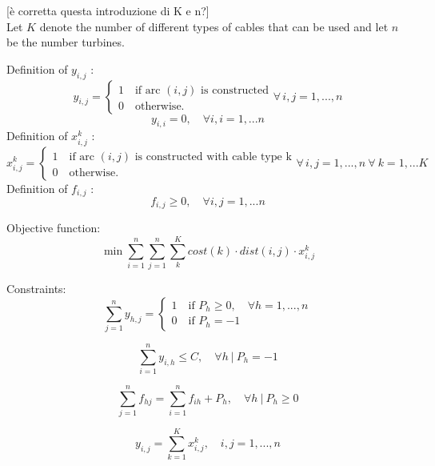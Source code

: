 [è corretta questa introduzione di K e n?]\\

Let $K$ denote the number of different types of cables that can be used and let $n$ be the number turbines. 

Definition of $y_{i,j}$ :
\[
	y_{i,j} =
   \begin{cases}
   1 \quad \mbox{if arc } (i,j) \mbox{ is constructed} \\
   0 \quad \mbox{otherwise.} 
   \end{cases}
   \forall \,i,j = 1, ..., n 
\]
\[
	y_{i,i} = 0, \quad \forall i,i= 1, ... n 
\]
Definition of $x^k_{i,j}$ :
\[
	x^k_{i,j} =
   \begin{cases}
   1 \quad \mbox{if arc } (i,j) \mbox{ is constructed with cable type k} \\
   0 \quad \mbox{otherwise.} 
   \end{cases}
   \forall \,i,j = 1, ..., n \ \forall \ k = 1,... K
\]
Definition of $f_{i,j}$ :
\[
	f_{i,j} \geq 0, \quad \forall i,j= 1, ... n
\]

Objective function: 
\begin{equation}\label{eq:obj}
	\min{\sum^n_{i=1} \sum^n_{j=1} \sum^K_{k} cost(k) \cdot dist(i,j) \cdot x^k_{i,j}}
\end{equation}

Constraints: 
\begin{equation}\label{eq:numberCable}
	\sum^n_{j = 1} y_{h,j} = 
	\begin{cases}
   1 \quad \mbox{if } P_h \geq 0, \quad \forall h=1,...,n \\
   0 \quad \mbox{if } P_h = -1
   \end{cases}
\end{equation}

\begin{equation}\label{eq:basestation}
	\sum^n_{i =1} y_{i,h} \leq C, \quad \forall h \ | \ P_h = -1
\end{equation}

\begin{equation}\label{eq:flux}
	\sum^n_{j=1} f_{hj} = \sum^n_{i=1} f_{ih}+ P_h, \quad \forall h \ | \ P_h \geq 0
\end{equation}

\begin{equation}\label{eq:oneCable}
	y_{i,j} = \sum^K_{k=1} x^k_{i,j}, \quad i,j = 1,...,n
\end{equation}


